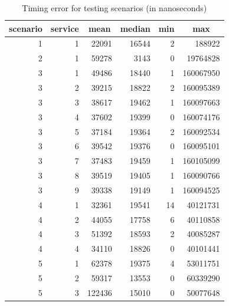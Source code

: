 \documentclass[conference]{IEEEtran}
\begin{document}
\begin{table}
	\caption{Timing error for testing scenarios (in nanoseconds)}
	\label{table:test_result}
	\centering
	\begin{tabular}{|r|r|r|r|r|r|}
		\hline
		\multicolumn{1}{|c|}{scenario} &
		\multicolumn{1}{|c|}{service} &
		\multicolumn{1}{|c|}{mean} &
		\multicolumn{1}{|c|}{median} &
		\multicolumn{1}{|c|}{min} &
		\multicolumn{1}{|c|}{max} \\ \hline
		1 & 1 & 22091 & 16544 & 2 & 188922 \\                                 \hline
		2 & 1 & 59278 & 3143 & 0 & 19764828 \\                                \hline
		3 & 1 & 49486 & 18440 & 1 & 160067950 \\                              \hline
		3 & 2 & 39215 & 18822 & 2 & 160095389 \\                              \hline
		3 & 3 & 38617 & 19462 & 1 & 160097663 \\                              \hline
		3 & 4 & 37602 & 19399 & 0 & 160074176 \\                              \hline
		3 & 5 & 37184 & 19364 & 2 & 160092534 \\                              \hline
		3 & 6 & 39542 & 19376 & 0 & 160095101 \\                              \hline
		3 & 7 & 37483 & 19459 & 1 & 160105099 \\                              \hline
		3 & 8 & 39519 & 19405 & 1 & 160090766 \\                              \hline
		3 & 9 & 39338 & 19149 & 1 & 160094525 \\                              \hline
		4 & 1 & 32361 & 19541 & 14 & 40121731 \\                              \hline
		4 & 2 & 44055 & 17758 & 6 & 40110858\\                                \hline
		4 & 3 & 51392 & 18593 & 2 & 40085287\\                                \hline
		4 & 4 & 34110 & 18826 & 0 & 40101441 \\                               \hline
		5 & 1 & 62378 & 19375 & 4 & 53011751 \\                               \hline
		5 & 2 & 59317 & 13553 & 0 & 60339290 \\                               \hline
		5 & 3 & 122436 & 15010 & 0 & 50077648 \\                              \hline
	\end{tabular}
\end{table}
\end{document}
